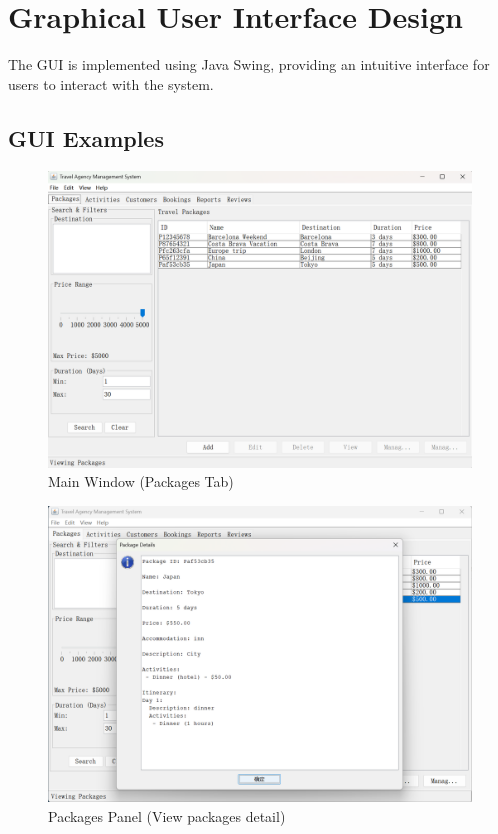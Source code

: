 \documentclass[12pt]{article}
\begin{document}
\section{Graphical User Interface Design}

The GUI is implemented using Java Swing, providing an intuitive interface for users to interact with the system.
\subsection{GUI Examples}

\begin{figure}[H]
\centering
\includegraphics[width=\textwidth]{gui1.png}
\caption{Main Window (Packages Tab)}
\end{figure}

\begin{figure}[H]
\centering
\includegraphics[width=\textwidth]{gui2.png}
\caption{Packages Panel (View packages detail)}
\end{figure}
\end{document}
